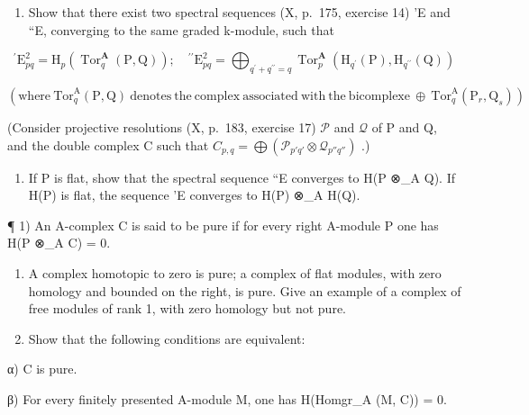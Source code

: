 \begin{enumerate}
\def\labelenumi{\alph{enumi})}
\tightlist
\item
  Show that there exist two spectral sequences (X, p.~175, exercise 14) 'E and ``E, converging to the same graded k-module, such that
\end{enumerate}

\[
^ {\prime} \mathrm{E} _ {p q} ^ {2} = \mathrm{H} _ {p} (\operatorname{Tor} _ {q} ^ {\mathbf {A}} (\mathrm{P}, \mathrm{Q})); \quad^ {\prime \prime} \mathrm{E} _ {p q} ^ {2} = \bigoplus_ {q ^ {\prime} + q ^ {\prime \prime} = q} \operatorname{Tor} _ {p} ^ {\mathbf {A}} \left(\mathrm{H} _ {q ^ {\prime}} (\mathrm{P}), \mathrm{H} _ {q ^ {\prime \prime}} (\mathrm{Q})\right)
\]

\((\mathrm{where}\ \mathrm{Tor}_{q}^{\mathrm{A}}(\mathrm{P},\mathrm{Q})\ \mathrm{denotes}\ \mathrm{the}\ \mathrm{complex}\ \mathrm{associated}\ \mathrm{with}\ \mathrm{the}\ \mathrm{bicomplexe}\ \oplus\ \mathrm{Tor}_{q}^{\mathrm{A}}(\mathrm{P}_{r},\mathrm{Q}_{s}))\)

(Consider projective resolutions (X, p.~183, exercise 17) \(\mathcal{P}\) and \(\mathcal{Q}\) of P and Q, and the double complex C such that \(C_{p,q} = \bigoplus (\mathcal{P}_{p'q'} \otimes \mathcal{Q}_{p''q''})\) .)

\begin{enumerate}
\def\labelenumi{\alph{enumi})}
\setcounter{enumi}{1}
\tightlist
\item
  If P is flat, show that the spectral sequence ``E converges to H(P ⊗\_A Q). If H(P) is flat, the sequence 'E converges to H(P) ⊗\_A H(Q).
\end{enumerate}


¶ 1) An A-complex C is said to be pure if for every right A-module P one has H(P ⊗\_A C) = 0.

\begin{enumerate}
\def\labelenumi{\alph{enumi})}
\item
  A complex homotopic to zero is pure; a complex of flat modules, with zero homology and bounded on the right, is pure. Give an example of a complex of free modules of rank 1, with zero homology but not pure.
\item
  Show that the following conditions are equivalent:
\end{enumerate}

α) C is pure.

β) For every finitely presented A-module M, one has H(Homgr\_A (M, C)) = 0.

